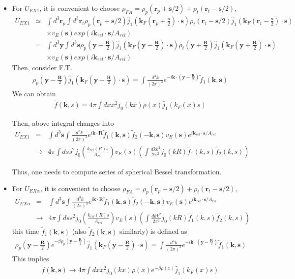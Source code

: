 \documentclass[11pt]{book}
\def\bm{\boldsymbol}
\def\vk{{\bm k}}
\def\vr{{\bm r}}
\def\vR{{\bm R}}
\newcommand{\bea}{\begin{eqnarray}}
\newcommand{\eea}{\end{eqnarray}}
\newcommand{\no}{\nonumber \\}
\begin{document}
\begin{itemize}
	\item For $U_{EX1}$, it is convenient to choose  $\rho_{FA} = \rho_{p}(\vr_p+{\bm s}/2)+\rho_t(\vr_t-{\bm s}/2)$,
	  \bea 
	   U_{EX1}& \simeq& \int d^3\vr_p \int d^3\vr_t  
	   \rho_p(\vr_p+{\bm s}/2)\hat{j}_1( {\bm k_F}(\vr_p+\frac{{\bm s}}{2})\cdot {\bm s})
	   \rho_t(\vr_t-{\bm s}/2)\hat{j}_1( {\bm k_F}(\vr_t-\frac{{\bm s}}{2})\cdot {\bm s})
	   \no & &\times   v_E({\bm s})  exp( i\vk_{rel}\cdot{\bm s} /A_{rel}) \no 
	   &=& \int d^3{\bm y} \int d^3{\bm s}  
	   \rho_p({\bm y}-\frac{\vR}{2})\hat{j}_1( {\bm k_F}({\bm y}-\frac{\vR}{2})\cdot {\bm s})
	   \rho_t({\bm y}+\frac{\vR}{2})\hat{j}_1( {\bm k_F}({\bm y}+\frac{\vR}{2})\cdot {\bm s})
	   \no & &\times   v_E({\bm s})  exp( i\vk_{rel}\cdot{\bm s} /A_{rel})
	  \eea 
	  Then, consider F.T.
	  \bea 
	  \rho_p({\bm y}-\frac{\vR}{2})\hat{j}_1( {\bm k_F}({\bm y}-\frac{\vR}{2})\cdot {\bm s})
	  = \int \frac{d^3 k}{(2\pi)^3} e^{-i\vk\cdot({\bm y}-\frac{\vR}{2})}
	     \tilde{f}_1({\bm k},{\bm s})
	  \eea 
	  We can obtain 
	  \bea 
	  \tilde{f}(\vk,s)  = 4\pi \int dx x^2 j_0( k x) \rho(x)\hat{j}_1(k_F(x)s ) 
	  \eea 
	  
	  Then, above integral changes into 
	  \bea 
	  U_{EX1}&=& \int d^3{\bm s}\int\frac{d^3 k}{(2\pi)^3}
	                e^{i\vk\cdot\vR} 
	                \tilde{f}_1(\vk,{\bm s})\tilde{f}_2(-\vk,{\bm s})
	                v_E({\bm s}) e^{ i\vk_{rel}\cdot{\bm s} /A_{rel}} \no 
	          &\to& 4\pi \int ds s^2 j_0(\frac{k_{rel}(R) s}{A_{rel}}) v_E(s)
	               \left(\int \frac{dk k^2}{2\pi^2} j_0(k R) \tilde{f}_1(k,s) \tilde{f}_2(k,s)  \right)     
	  \eea 
	  
	  Thus, one needs to compute series of spherical Bessel transformation. 
	  
	\item For $U_{EX\alpha}$, it is convenient to choose  $\rho_{FA} = \rho_{p}(\vr_p+{\bm s}/2)+\rho_t(\vr_t-{\bm s}/2)$,
	  \bea 
	   U_{EX\alpha} &=& \int d^3{\bm s}\int\frac{d^3 k}{(2\pi)^3}
 	                    e^{i\vk\cdot\vR} 
 	                   \tilde{f}_1(\vk,{\bm s})\tilde{f}_2(-\vk,{\bm s})
	                    v_E({\bm s}) e^{ i\vk_{rel}\cdot{\bm s} /A_{rel}} 
	                    \no 
	                    &\to& 4\pi \int ds s^2 j_0(\frac{k_{rel}(R) s}{A_{rel}}) v_E(s)
	                    \left(\int \frac{dk k^2}{2\pi^2} j_0(k R) \tilde{f}_1(k,s) \tilde{f}_2(k,s)  \right)
	  \eea 
	  this time $\tilde{f}_1({\bm k},{\bm s})$ (also $\tilde{f}_2({\bm k},{\bm s})$ similarly)
	  is defined as 
	  \bea 
	   \rho_p({\bm y}-\frac{\vR}{2})e^{-\beta \rho_p({\bm y}-\frac{\vR}{2}) }\hat{j}_1( {\bm k_F}({\bm y}-\frac{\vR}{2})\cdot {\bm s})
	   = \int \frac{d^3 k}{(2\pi)^3} e^{-i\vk\cdot({\bm y}-\frac{\vR}{2})}
	   \tilde{f}_1({\bm k},{\bm s})
	  \eea 
	  This implies
	  \bea 
	  \tilde{f}(\vk,{\bm s}) \to  4\pi \int dx x^2 j_0(k x) \rho(x)e^{-\beta \rho(x)}\hat{j}_1(k_F(x) s)
	  \eea 
	  

\end{itemize}
\end{document}
